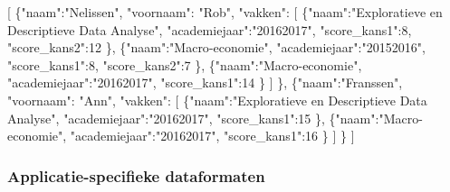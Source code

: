\documentclass[]{tufte-book}
\newenvironment{Shaded}{}{}
\newcommand{\DataTypeTok}[1]{\textcolor[rgb]{0.56,0.13,0.00}{#1}}
\newcommand{\DecValTok}[1]{\textcolor[rgb]{0.25,0.63,0.44}{#1}}
\newcommand{\FunctionTok}[1]{\textcolor[rgb]{0.02,0.16,0.49}{#1}}
\newcommand{\OtherTok}[1]{\textcolor[rgb]{0.00,0.44,0.13}{#1}}
\newcommand{\StringTok}[1]{\textcolor[rgb]{0.25,0.44,0.63}{#1}}
\begin{document}
\begin{Shaded}
\begin{Highlighting}[]
\OtherTok{[}
  \FunctionTok{\{}\DataTypeTok{"naam"}\FunctionTok{:}\StringTok{"Nelissen"}\FunctionTok{,}
   \DataTypeTok{"voornaam"}\FunctionTok{:} \StringTok{"Rob"}\FunctionTok{,}
   \DataTypeTok{"vakken"}\FunctionTok{:} 
    \OtherTok{[}
      \FunctionTok{\{}\DataTypeTok{"naam"}\FunctionTok{:}\StringTok{"Exploratieve en Descriptieve Data Analyse"}\FunctionTok{,}
       \DataTypeTok{"academiejaar"}\FunctionTok{:}\StringTok{"20162017"}\FunctionTok{,}
       \DataTypeTok{"score\_kans1"}\FunctionTok{:}\DecValTok{8}\FunctionTok{,}
       \DataTypeTok{"score\_kans2"}\FunctionTok{:}\DecValTok{12}
      \FunctionTok{\}}\OtherTok{,}
      \FunctionTok{\{}\DataTypeTok{"naam"}\FunctionTok{:}\StringTok{"Macro{-}economie"}\FunctionTok{,}
       \DataTypeTok{"academiejaar"}\FunctionTok{:}\StringTok{"20152016"}\FunctionTok{,}
       \DataTypeTok{"score\_kans1"}\FunctionTok{:}\DecValTok{8}\FunctionTok{,}
       \DataTypeTok{"score\_kans2"}\FunctionTok{:}\DecValTok{7}
      \FunctionTok{\}}\OtherTok{,}
      \FunctionTok{\{}\DataTypeTok{"naam"}\FunctionTok{:}\StringTok{"Macro{-}economie"}\FunctionTok{,}
       \DataTypeTok{"academiejaar"}\FunctionTok{:}\StringTok{"20162017"}\FunctionTok{,}
       \DataTypeTok{"score\_kans1"}\FunctionTok{:}\DecValTok{14}
      \FunctionTok{\}}
    \OtherTok{]}
  \FunctionTok{\}}\OtherTok{,}
  \FunctionTok{\{}\DataTypeTok{"naam"}\FunctionTok{:}\StringTok{"Franssen"}\FunctionTok{,}
   \DataTypeTok{"voornaam"}\FunctionTok{:} \StringTok{"Ann"}\FunctionTok{,}
   \DataTypeTok{"vakken"}\FunctionTok{:} 
    \OtherTok{[}
      \FunctionTok{\{}\DataTypeTok{"naam"}\FunctionTok{:}\StringTok{"Exploratieve en Descriptieve Data Analyse"}\FunctionTok{,}
       \DataTypeTok{"academiejaar"}\FunctionTok{:}\StringTok{"20162017"}\FunctionTok{,}
       \DataTypeTok{"score\_kans1"}\FunctionTok{:}\DecValTok{15}
      \FunctionTok{\}}\OtherTok{,}
      \FunctionTok{\{}\DataTypeTok{"naam"}\FunctionTok{:}\StringTok{"Macro{-}economie"}\FunctionTok{,}
       \DataTypeTok{"academiejaar"}\FunctionTok{:}\StringTok{"20162017"}\FunctionTok{,}
       \DataTypeTok{"score\_kans1"}\FunctionTok{:}\DecValTok{16}
      \FunctionTok{\}}
    \OtherTok{]}
  \FunctionTok{\}}
\OtherTok{]}
\end{Highlighting}
\end{Shaded}

\hypertarget{applicatie-specifieke-dataformaten}{%
\subsubsection{Applicatie-specifieke dataformaten}\label{applicatie-specifieke-dataformaten}}
\end{document}
